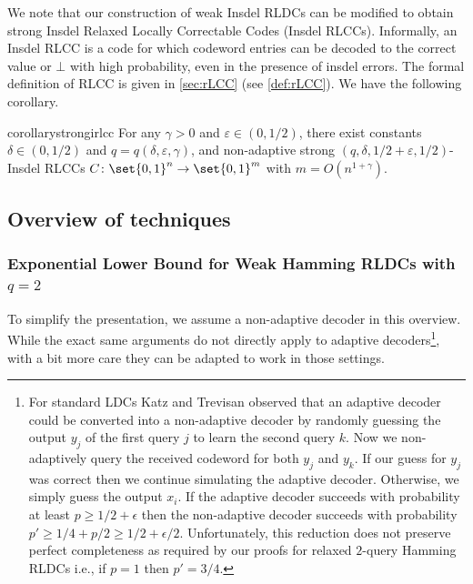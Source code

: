 \documentclass[10pt,a4paper]{article}
\theoremstyle{remark}
\newcommand{\eps}{\ensuremath{\varepsilon}}
\begin{document}
 
 We note that our construction of weak Insdel RLDCs can be modified to obtain strong Insdel Relaxed Locally Correctable Codes (Insdel RLCCs). Informally, an Insdel RLCC is a code for which codeword entries can be decoded to the correct value or $\bot$ with high probability,   even in the presence of insdel errors. 
 The formal definition of RLCC is given in \cref{sec:rLCC} (see \cref{def:rLCC}). We have the following corollary.
 
 \begin{restatable}{corollary}{strongirlcc}\label{thm:main-rilcc-construction}
 For any $\gamma>0$ and $\eps \in (0,1/2)$, there exist constants $\delta \in (0,1/2)$ and $q=q(\delta,\eps,\gamma)$, and non-adaptive strong $(q,\delta,1/2 + \eps, 1/2 )$-Insdel RLCCs $C\colon \set{0,1}^n\rightarrow \set{0,1}^m$ with $m=O(n^{1+\gamma})$. %
 \end{restatable}
 
 


\subsection{Overview of techniques}

\subsubsection{Exponential Lower Bound for Weak Hamming RLDCs with \texorpdfstring{$q=2$}{q=2}}
To simplify the presentation, we assume a non-adaptive decoder in this overview. While the exact same arguments do not directly apply to adaptive decoders\footnote{\label{foot:kt-obs}For standard LDCs Katz and Trevisan \cite{KatzT00} observed that an adaptive decoder could be converted into a non-adaptive decoder by randomly guessing the output $y_j$ of the first query $j$ to learn the second query $k$. Now we non-adaptively query the received codeword for both $y_j$ and $y_k$. If our guess for $y_j$ was correct then we continue simulating the adaptive decoder. Otherwise, we simply guess the output $x_i$. If the adaptive decoder succeeds with probability at least $p \geq 1/2 + \epsilon$ then the non-adaptive decoder succeeds with probability $p' \geq 1/4 + p/2 \geq 1/2 + \epsilon/2$. Unfortunately, this reduction does not preserve perfect completeness as required by our proofs for relaxed $2$-query Hamming RLDCs i.e., if $p=1$ then $p' = 3/4$.}, with a bit more care they can be adapted to work in those settings. 
\end{document}
